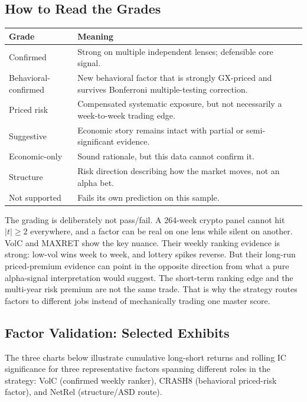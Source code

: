 \documentclass[11pt,a4paper]{article}
\begin{document}
\subsection{How to Read the Grades}

\begin{center}
\small
\begin{tabularx}{\textwidth}{L{0.25\textwidth}X}
\toprule
{}
\textbf{Grade} & \textbf{Meaning} \\
\midrule
Confirmed & Strong on multiple independent lenses; defensible core signal. \\
Behavioral-confirmed & New behavioral factor that is strongly GX-priced and survives Bonferroni multiple-testing correction. \\
Priced risk & Compensated systematic exposure, but not necessarily a week-to-week trading edge. \\
Suggestive & Economic story remains intact with partial or semi-significant evidence. \\
Economic-only & Sound rationale, but this data cannot confirm it. \\
Structure & Risk direction describing how the market moves, not an alpha bet. \\
Not supported & Fails its own prediction on this sample. \\
\bottomrule
\end{tabularx}
\end{center}

The grading is deliberately not pass/fail. A 264-week crypto panel cannot hit $|t|\geq2$ everywhere, and a factor can be real on one lens while silent on another. VolC and MAXRET show the key nuance. Their weekly ranking evidence is strong: low-vol wins week to week, and lottery spikes reverse. But their long-run priced-premium evidence can point in the opposite direction from what a pure alpha-signal interpretation would suggest. The short-term ranking edge and the multi-year risk premium are not the same trade. That is why the strategy routes factors to different jobs instead of mechanically trading one master score.

\subsection{Factor Validation: Selected Exhibits}

The three charts below illustrate cumulative long-short returns and rolling IC significance for three representative factors spanning different roles in the strategy: VolC (confirmed weekly ranker), CRASH8 (behavioral priced-risk factor), and NetRel (structure/ASD route).
\end{document}
